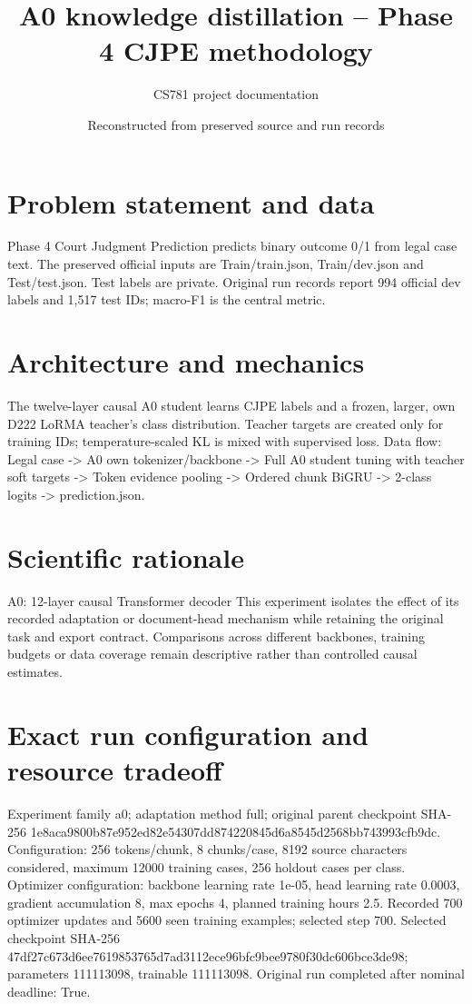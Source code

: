 \documentclass[11pt,a4paper]{article}
\begin{document}
\title{A0 knowledge distillation -- Phase 4 CJPE methodology}
\author{CS781 project documentation}
\date{Reconstructed from preserved source and run records}
\maketitle
\section{Problem statement and data}
Phase 4 Court Judgment Prediction predicts binary outcome 0/1 from legal case text. The preserved official inputs are Train/train.json, Train/dev.json and Test/test.json. Test labels are private. Original run records report 994 official dev labels and 1,517 test IDs; macro-F1 is the central metric.
\section{Architecture and mechanics}
The twelve-layer causal A0 student learns CJPE labels and a frozen, larger, own D222 LoRMA teacher's class distribution. Teacher targets are created only for training IDs; temperature-scaled KL is mixed with supervised loss. Data flow: Legal case -> A0 own tokenizer/backbone -> Full A0 student tuning with teacher soft targets -> Token evidence pooling -> Ordered chunk BiGRU -> 2-class logits -> prediction.json.
\section{Scientific rationale}
A0: 12-layer causal Transformer decoder This experiment isolates the effect of its recorded adaptation or document-head mechanism while retaining the original task and export contract. Comparisons across different backbones, training budgets or data coverage remain descriptive rather than controlled causal estimates.
\section{Exact run configuration and resource tradeoff}
Experiment family a0; adaptation method full; original parent checkpoint SHA-256 1e8aca9800b87e952ed82e54307dd874220845d6a8545d2568bb743993cfb9dc. Configuration: 256 tokens/chunk, 8 chunks/case, 8192 source characters considered, maximum 12000 training cases, 256 holdout cases per class. Optimizer configuration: backbone learning rate 1e-05, head learning rate 0.0003, gradient accumulation 8, max epochs 4, planned training hours 2.5. Recorded 700 optimizer updates and 5600 seen training examples; selected step 700. Selected checkpoint SHA-256 47df27c673d6ee7619853765d7ad3112ece96bfc9bee9780f30dc606bce3de98; parameters 111113098, trainable 111113098. Original run completed after nominal deadline: True.
\end{document}
